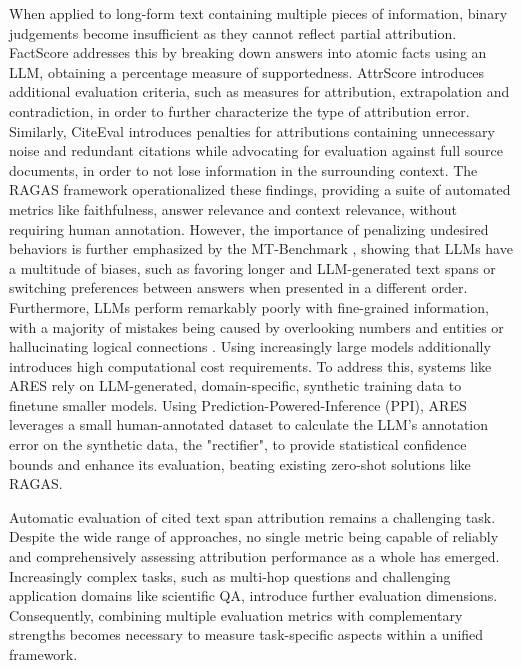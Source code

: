 When applied to long-form text containing multiple pieces of information, binary judgements become insufficient as they cannot reflect partial attribution. FactScore \cite{factScore} addresses this by breaking down answers into atomic facts using an LLM, obtaining a percentage measure of supportedness. AttrScore \cite{automaticEvaluationOfAttribution} introduces additional evaluation criteria, such as measures for attribution, extrapolation and contradiction, in order to further characterize the type of attribution error. Similarly, CiteEval \cite{citeEvalPrincipleDrivenCitationEvaluationForSourceAttribution} introduces penalties for attributions containing unnecessary noise and redundant citations while advocating for evaluation against full source documents, in order to not lose information in the surrounding context. The RAGAS \cite{ragas} framework operationalized these findings, providing a suite of automated metrics like faithfulness, answer relevance and context relevance, without requiring human annotation. However, the importance of penalizing undesired behaviors is further emphasized by the MT-Benchmark \cite{judgingLLMAsAJudgeMTBench}, showing that LLMs have a multitude of biases, such as favoring longer and LLM-generated text spans or switching preferences between answers when presented in a different order. Furthermore, LLMs perform remarkably poorly with fine-grained information, with a majority of mistakes being caused by overlooking numbers and entities or hallucinating logical connections \cite{attributionBench}. Using increasingly large models additionally introduces high computational cost requirements. To address this, systems like ARES \cite{ares} rely on LLM-generated, domain-specific, synthetic training data to finetune smaller models. Using Prediction-Powered-Inference (PPI), ARES leverages a small human-annotated dataset to calculate the LLM's annotation error on the synthetic data, the "rectifier", to provide statistical confidence bounds and enhance its evaluation, beating existing zero-shot solutions like RAGAS.  

Automatic evaluation of cited text span attribution remains a challenging task. Despite the wide range of approaches, no single metric being capable of reliably and comprehensively assessing attribution performance as a whole has emerged. Increasingly complex tasks, such as multi-hop questions and challenging application domains like scientific QA, introduce further evaluation dimensions. Consequently, combining multiple evaluation metrics with complementary strengths becomes necessary to measure task-specific aspects within a unified framework.

